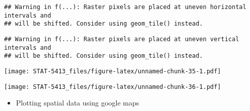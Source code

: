 \documentclass[]{book}
\newenvironment{Shaded}{\begin{snugshade}}{\end{snugshade}}
\newcommand{\CommentTok}[1]{\textcolor[rgb]{0.56,0.35,0.01}{\textit{#1}}}
\newcommand{\DataTypeTok}[1]{\textcolor[rgb]{0.13,0.29,0.53}{#1}}
\newcommand{\DecValTok}[1]{\textcolor[rgb]{0.00,0.00,0.81}{#1}}
\newcommand{\KeywordTok}[1]{\textcolor[rgb]{0.13,0.29,0.53}{\textbf{#1}}}
\newcommand{\NormalTok}[1]{#1}
\newcommand{\OperatorTok}[1]{\textcolor[rgb]{0.81,0.36,0.00}{\textbf{#1}}}
\newcommand{\StringTok}[1]{\textcolor[rgb]{0.31,0.60,0.02}{#1}}
\providecommand{\tightlist}{%
  \setlength{\itemsep}{0pt}\setlength{\parskip}{0pt}}
\begin{document}
\begin{Shaded}
\end{Shaded}

\begin{verbatim}
## Warning in f(...): Raster pixels are placed at uneven horizontal intervals and
## will be shifted. Consider using geom_tile() instead.
\end{verbatim}

\begin{verbatim}
## Warning in f(...): Raster pixels are placed at uneven vertical intervals and
## will be shifted. Consider using geom_tile() instead.
\end{verbatim}

\texttt{[image: STAT-5413\_files/figure-latex/unnamed-chunk-35-1.pdf]}

\begin{Shaded}
\end{Shaded}

\texttt{[image: STAT-5413\_files/figure-latex/unnamed-chunk-36-1.pdf]}

\begin{itemize}
\tightlist
\item
  Plotting spatial data using google maps
\end{itemize}
\end{document}
